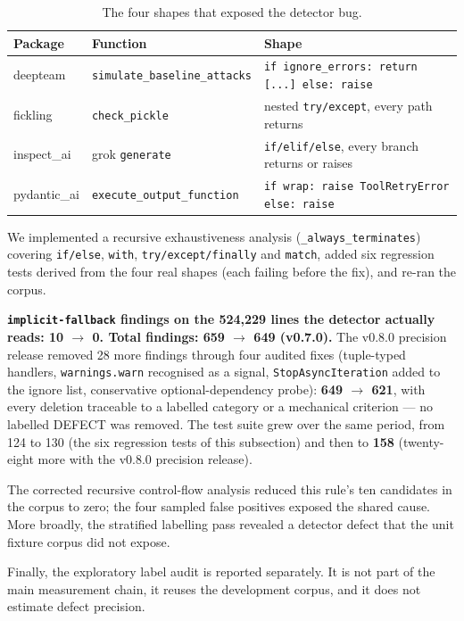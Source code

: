 \documentclass[10pt,a4paper]{article}
\begin{document}
\begin{table}[htbp]
\centering\small
\caption{The four shapes that exposed the detector bug.}
\label{tab:fpshapes}
\begin{tabular}{@{}lll@{}}
\toprule
Package & Function & Shape \\
\midrule
deepteam & \texttt{simulate\_baseline\_attacks} & \texttt{if ignore\_errors:
return [...] else: raise} \\
fickling & \texttt{check\_pickle} & nested \texttt{try/except}, every path
returns \\
inspect\_ai & grok \texttt{generate} & \texttt{if/elif/else}, every branch
returns or raises \\
pydantic\_ai & \texttt{execute\_output\_function} & \texttt{if wrap: raise
ToolRetryError else: raise} \\
\bottomrule
\end{tabular}
\end{table}

We implemented a recursive exhaustiveness analysis
(\texttt{\_always\_terminates}) covering \texttt{if/else}, \texttt{with},
\texttt{try/except/finally} and \texttt{match}, added six regression tests derived
from the four real shapes (each failing before the fix), and re-ran the corpus.

\textbf{\texttt{implicit-fallback} findings on the 524{,}229 lines the detector
actually reads: 10 $\rightarrow$ 0.
Total findings: 659 $\rightarrow$ 649 (v0.7.0).} The v0.8.0 precision release
removed 28 more findings through four audited fixes (tuple-typed handlers,
\texttt{warnings.warn} recognised as a signal, \texttt{StopAsyncIteration}
added to the ignore list, conservative optional-dependency probe):
\textbf{649 $\rightarrow$ 621}, with every deletion traceable to a labelled
category or a mechanical criterion --- no labelled DEFECT was removed. The test
suite grew over the same period, from 124 to 130 (the six regression tests of
this subsection) and then to \textbf{158} (twenty-eight more with the v0.8.0
precision release).

The corrected recursive control-flow analysis reduced this rule's ten candidates
in the corpus to zero; the four sampled false positives exposed the shared cause.
More broadly, the stratified labelling pass revealed a detector defect that the unit
fixture corpus did not expose.

Finally, the exploratory label audit is reported separately. It is not part of
the main measurement chain, it reuses the development corpus, and it does not
estimate defect precision.
\end{document}
